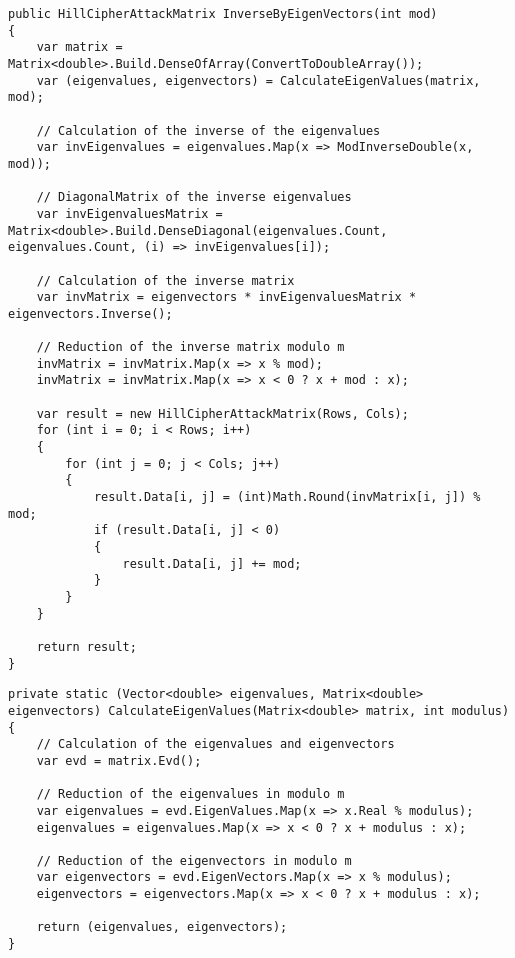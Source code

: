 \documentclass[conference]{IEEEtran}
\begin{document}
\begin{lstlisting}[caption={InverseByEigenVectors method}, label={lst:calcInverseEigenVec}]
public HillCipherAttackMatrix InverseByEigenVectors(int mod)
{
    var matrix = Matrix<double>.Build.DenseOfArray(ConvertToDoubleArray());
    var (eigenvalues, eigenvectors) = CalculateEigenValues(matrix, mod);

    // Calculation of the inverse of the eigenvalues
    var invEigenvalues = eigenvalues.Map(x => ModInverseDouble(x, mod));

    // DiagonalMatrix of the inverse eigenvalues
    var invEigenvaluesMatrix = Matrix<double>.Build.DenseDiagonal(eigenvalues.Count, eigenvalues.Count, (i) => invEigenvalues[i]);

    // Calculation of the inverse matrix
    var invMatrix = eigenvectors * invEigenvaluesMatrix * eigenvectors.Inverse();

    // Reduction of the inverse matrix modulo m
    invMatrix = invMatrix.Map(x => x % mod);
    invMatrix = invMatrix.Map(x => x < 0 ? x + mod : x);

    var result = new HillCipherAttackMatrix(Rows, Cols);
    for (int i = 0; i < Rows; i++)
    {
        for (int j = 0; j < Cols; j++)
        {
            result.Data[i, j] = (int)Math.Round(invMatrix[i, j]) % mod;
            if (result.Data[i, j] < 0)
            {
                result.Data[i, j] += mod;
            }
        }
    }

    return result;
}
\end{lstlisting}

\begin{lstlisting}[caption={CalculateEigenValues method}, label={lst:calcEigenVal}]
private static (Vector<double> eigenvalues, Matrix<double> eigenvectors) CalculateEigenValues(Matrix<double> matrix, int modulus)
{
    // Calculation of the eigenvalues and eigenvectors
    var evd = matrix.Evd();

    // Reduction of the eigenvalues in modulo m
    var eigenvalues = evd.EigenValues.Map(x => x.Real % modulus);
    eigenvalues = eigenvalues.Map(x => x < 0 ? x + modulus : x);

    // Reduction of the eigenvectors in modulo m
    var eigenvectors = evd.EigenVectors.Map(x => x % modulus);
    eigenvectors = eigenvectors.Map(x => x < 0 ? x + modulus : x);

    return (eigenvalues, eigenvectors);
}
\end{lstlisting}
\end{document}
